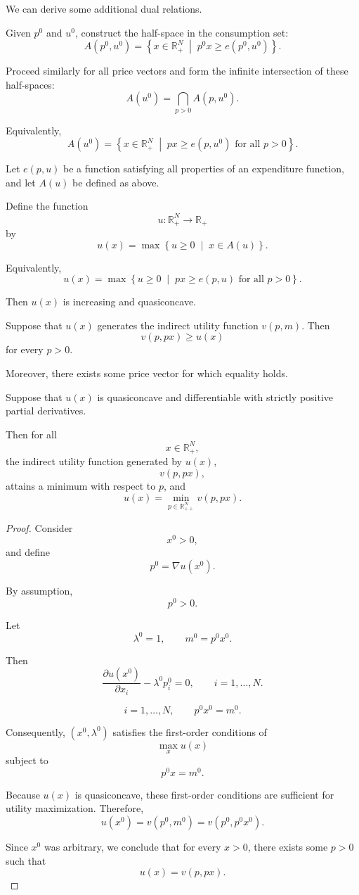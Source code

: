 We can derive some additional dual relations.

Given \(p^0\) and \(u^0\), construct the half-space in the consumption set:
\[
A(p^0,u^0)
=
\left\{
x \in \mathbb{R}_+^N
\;\middle|\;
p^0x \ge e(p^0,u^0)
\right\}.
\]

Proceed similarly for all price vectors and form the infinite intersection of these half-spaces:
\[
A(u^0)
=
\bigcap_{p>0} A(p,u^0).
\]

Equivalently,
\[
A(u^0)
=
\left\{
x \in \mathbb{R}_+^N
\;\middle|\;
px \ge e(p,u^0)
\text{ for all } p>0
\right\}.
\]

\begin{theorem}
Let \(e(p,u)\) be a function satisfying all properties of an expenditure function, and let \(A(u)\) be defined as above.

Define the function
\[
u:\mathbb{R}_+^N \to \mathbb{R}_+
\]
by
\[
u(x)
=
\max
\left\{
u \ge 0
\;\middle|\;
x \in A(u)
\right\}.
\]

Equivalently,
\[
u(x)
=
\max
\left\{
u \ge 0
\;\middle|\;
px \ge e(p,u)
\text{ for all } p>0
\right\}.
\]

Then \(u(x)\) is increasing and quasiconcave.
\end{theorem}

Suppose that \(u(x)\) generates the indirect utility function \(v(p,m)\). Then
\[
v(p,px)\ge u(x)
\]
for every \(p>0\).

Moreover, there exists some price vector for which equality holds.

\begin{theorem}
Suppose that \(u(x)\) is quasiconcave and differentiable with strictly positive partial derivatives.

Then for all
\[
x\in \mathbb{R}_+^N,
\]
the indirect utility function generated by \(u(x)\),
\[
v(p,px),
\]
attains a minimum with respect to \(p\), and
\[
u(x)
=
\min_{p\in \mathbb{R}_{++}^N} v(p,px).
\]
\end{theorem}

\begin{proof}
Consider
\[
x^0>0,
\]
and define
\[
p^0=\nabla u(x^0).
\]

By assumption,
\[
p^0>0.
\]

Let
\[
\lambda^0=1,
\qquad
m^0=p^0x^0.
\]

Then
\[
\frac{\partial u(x^0)}{\partial x_i}
-
\lambda^0 p_i^0
=
0,
\qquad
i=1,\dots,N.
\]





\[
i=1,\dots,N,
\qquad
p^0x^0=m^0.
\]

Consequently, \((x^0,\lambda^0)\) satisfies the first-order conditions of
\[
\max_x u(x)
\]
subject to
\[
p^0x=m^0.
\]

Because \(u(x)\) is quasiconcave, these first-order conditions are sufficient for utility maximization. Therefore,
\[
u(x^0)
=
v(p^0,m^0)
=
v(p^0,p^0x^0).
\]

Since \(x^0\) was arbitrary, we conclude that for every \(x>0\), there exists some \(p>0\) such that
\[
u(x)=v(p,px).
\]
\end{proof}

